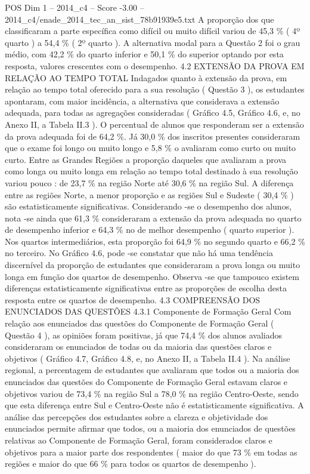 \begin{textsample}{POS Dim 1 – 2014\_c4 – Score -3.00 – 2014\_c4/enade\_2014\_tec\_an\_sist\_78b91939e5.txt}
A proporção dos que classificaram a parte específica como difícil ou muito difícil variou de 45,3 \% ( 4º quarto ) a 54,4 \% ( 2º quarto ).
A alternativa modal para a Questão 2 foi o grau médio, com 42,2 \% do quarto inferior e 50,1 \% do superior optando por esta resposta, valores crescentes com o desempenho. 4.2 EXTENSÃO DA PROVA EM RELAÇÃO AO TEMPO TOTAL Indagados quanto à extensão da prova, em relação ao tempo total oferecido para a sua resolução ( Questão 3 ), os estudantes apontaram, com maior incidência, a alternativa que considerava a extensão adequada, para todas as agregações consideradas ( Gráfico 4.5, Gráfico 4.6, e, no Anexo II, a Tabela II.3 ).
O percentual de alunos que responderam ser a extensão da prova adequada foi de 64,2 \%.
Já 30,0 \% dos inscritos presentes consideraram que o exame foi longo ou muito longo e 5,8 \% o avaliaram como curto ou muito curto.
Entre as Grandes Regiões a proporção daqueles que avaliaram a prova como longa ou muito longa em relação ao tempo total destinado à sua resolução variou pouco : de 23,7 \% na região Norte até 30,6 \% na região Sul.
A diferença entre as regiões Norte, a menor proporção e as regiões Sul e Sudeste ( 30,4 \% ) são estatisticamente significativas.
Considerando -se o desempenho dos alunos, nota -se ainda que 61,3 \% consideraram a extensão da prova adequada no quarto de desempenho inferior e 64,3 \% no de melhor desempenho ( quarto superior ).
Nos quartos intermediários, esta proporção foi 64,9 \% no segundo quarto e 66,2 \% no terceiro.
No Gráfico 4.6, pode -se constatar que não há uma tendência discernível da proporção de estudantes que consideraram a prova longa ou muito longa em função dos quartos de desempenho.
Observa -se que tampouco existem diferenças estatisticamente significativas entre as proporções de escolha desta resposta entre os quartos de desempenho. 4.3 COMPREENSÃO DOS ENUNCIADOS DAS QUESTÕES 4.3.1 Componente de Formação Geral Com relação aos enunciados das questões do Componente de Formação Geral ( Questão 4 ), as opiniões foram positivas, já que 74,4 \% dos alunos avaliados consideraram os enunciados de todas ou da maioria das questões claros e objetivos ( Gráfico 4.7, Gráfico 4.8, e, no Anexo II, a Tabela II.4 ).
Na análise regional, a percentagem de estudantes que avaliaram que todos ou a maioria dos enunciados das questões do Componente de Formação Geral estavam claros e objetivos variou de 73,4 \% na região Sul a 78,0 \% na região Centro-Oeste, sendo que esta diferença entre Sul e Centro-Oeste não é estatisticamente significativa.
A análise das percepções dos estudantes sobre a clareza e objetividade dos enunciados permite afirmar que todos, ou a maioria dos enunciados de questões relativas ao Componente de Formação Geral, foram considerados claros e objetivos para a maior parte dos respondentes ( maior do que 73 \% em todas as regiões e maior do que 66 \% para todos os quartos de desempenho ).

\end{textsample}
